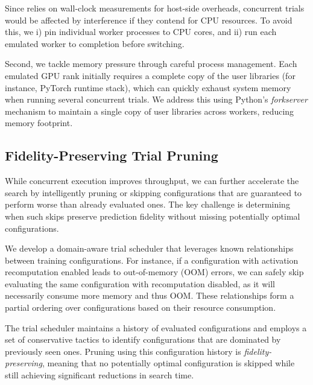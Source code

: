 Since \sysname relies on wall-clock measurements for host-side overheads, concurrent trials would be affected by interference if they contend for CPU resources. To avoid this, we i) pin individual worker processes to CPU cores, and ii) run each emulated worker to completion before switching.

Second, we tackle memory pressure through careful process management. Each emulated GPU rank initially requires a complete copy of the user libraries (for instance, PyTorch runtime stack), which can quickly exhaust system memory when running several concurrent trials. We address this using Python's \textit{forkserver} mechanism to maintain a single copy of user libraries across workers, reducing memory footprint.




\subsection{Fidelity-Preserving Trial Pruning}

While concurrent execution improves throughput, we can further accelerate the search by intelligently pruning or skipping configurations that are guaranteed to perform worse than already evaluated ones. The key challenge is determining when such skips preserve prediction fidelity without missing potentially optimal configurations.

We develop a domain-aware trial scheduler that leverages known relationships between training configurations. For instance, if a configuration with activation recomputation enabled leads to out-of-memory (OOM) errors, we can safely skip evaluating the same configuration with recomputation disabled, as it will necessarily consume more memory and thus OOM. These relationships form a partial ordering over configurations based on their resource consumption.

The trial scheduler maintains a history of evaluated configurations and employs a set of conservative tactics to identify configurations that are dominated by previously seen ones. Pruning using this configuration history is \textit{fidelity-preserving}, meaning that no potentially optimal configuration is skipped while still achieving significant reductions in search time.

